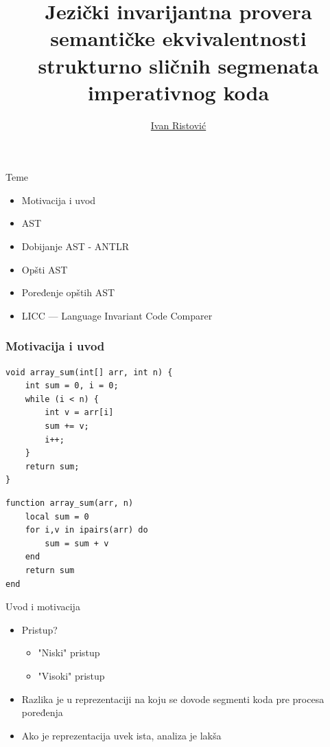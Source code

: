 \documentclass{beamer}
\title{Jezi\v{c}ki invarijantna provera semanti\v{c}ke ekvivalentnosti strukturno sli\v{c}nih segmenata imperativnog koda}
\author{\href{mailto:ivan_ristovic@math.rs}{Ivan Ristovi\'c}}
\date{}
\begin{document}
\begin{frame}
    \titlepage
\end{frame}

\begin{frame}{Teme}
    \begin{itemize}
        \item Motivacija i uvod
        \item AST
        \item Dobijanje AST - ANTLR
        \item Op\v{s}ti AST
        \item Poređenje op\v{s}tih AST
        \item LICC --- Language Invariant Code Comparer
    \end{itemize}
\end{frame}

\begin{frame}[fragile]
\frametitle{Motivacija i uvod}
\begin{lstlisting}
void array_sum(int[] arr, int n) {
    int sum = 0, i = 0;
    while (i < n) {
        int v = arr[i]
        sum += v;
        i++;
    }
    return sum;
}
\end{lstlisting}
\begin{lstlisting}
function array_sum(arr, n)
    local sum = 0
    for i,v in ipairs(arr) do
        sum = sum + v
    end
    return sum
end
\end{lstlisting}
\end{frame}

\begin{frame}{Uvod i motivacija}
    \begin{itemize}
        \item Pristup?
        \begin{itemize}
            \item "Niski" pristup
            \item "Visoki" pristup 
        \end{itemize}
        \item Razlika je u reprezentaciji na koju se dovode segmenti koda pre procesa poređenja
        \item Ako je reprezentacija uvek ista, analiza je lakša
    \end{itemize}
\end{frame}
\end{document}
